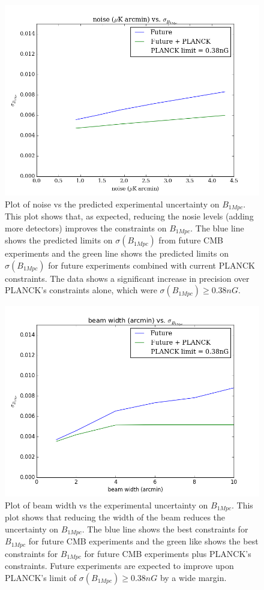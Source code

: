 \begin{figure}[h]
\centering
\includegraphics[scale=0.8]{images/noise.png}
\caption{Plot of noise vs the predicted experimental uncertainty on $B_{1Mpc}$. This plot shows that, as expected, reducing the nosie levels (adding more detectors) improves the constraints on $B_{1Mpc}$. The blue line shows the predicted limits on $\sigma(B_{1Mpc})$ from future CMB experiments and the green line shows the predicted limits on $\sigma(B_{1Mpc})$ for future experiments combined with current PLANCK constraints. The data shows a significant increase in precision over PLANCK's constraints alone, which were $\sigma(B_{1Mpc}) \geq 0.38nG$.}
\label{fig:noise}
\end{figure}

\begin{figure}[h]
\centering
\includegraphics[scale=0.8]{images/width.png}
\caption{Plot of beam width vs the experimental uncertainty on $B_{1Mpc}$. This plot shows that reducing the width of the beam reduces the uncertainty on $B_{1Mpc}$. The blue line shows the best constraints for $B_{1Mpc}$ for future CMB experiments and the green like shows the best constraints for $B_{1Mpc}$ for future CMB experiments plus PLANCK's constraints. Future experiments are expected to improve upon PLANCK's limit of $\sigma(B_{1Mpc}) \geq 0.38nG$ by a wide margin.}
\label{fig:width}
\end{figure}

